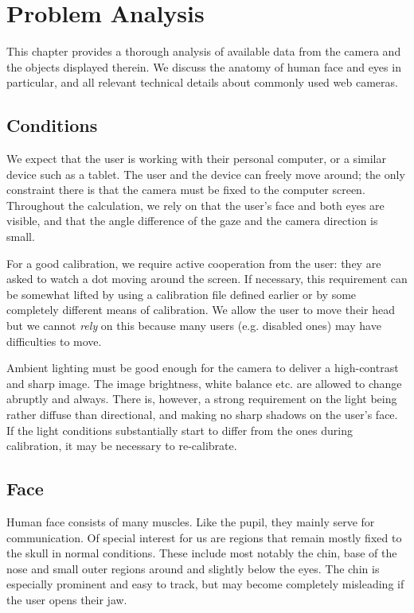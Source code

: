\chapter{Problem Analysis}

This chapter provides a thorough analysis of available data from the camera and the objects displayed therein.
We discuss the anatomy of human face and eyes in particular, and all relevant technical details about commonly used web cameras.

\section{Conditions}

We expect that the user is working with their personal computer, or a similar device such as a tablet.
The user and the device can freely move around; the only constraint there is that the camera must be fixed to the computer screen.
Throughout the calculation, we rely on that the user's face and both eyes are visible, and that the angle difference of the gaze and the camera direction is small.

For a good calibration, we require active cooperation from the user: they are asked to watch a dot moving around the screen.
If necessary, this requirement can be somewhat lifted by using a calibration file defined earlier or by some completely different means of calibration.
We allow the user to move their head but we cannot \textit{rely} on this because many users (e.g. disabled ones) may have difficulties to move.

Ambient lighting must be good enough for the camera to deliver a high-contrast and sharp image.
The image brightness, white balance etc. are allowed to change abruptly and always.
There is, however, a strong requirement on the light being rather diffuse than directional, and making no sharp shadows on the user's face.
If the light conditions substantially start to differ from the ones during calibration, it may be necessary to re-calibrate.

\section{Face}

Human face consists of many muscles.
Like the pupil, they mainly serve for communication.
Of special interest for us are regions that remain mostly fixed to the skull in normal conditions.
These include most notably the chin, base of the nose and small outer regions around and slightly below the eyes.
The chin is especially prominent and easy to track, but may become completely misleading if the user opens their jaw.
\todo{\dots}

